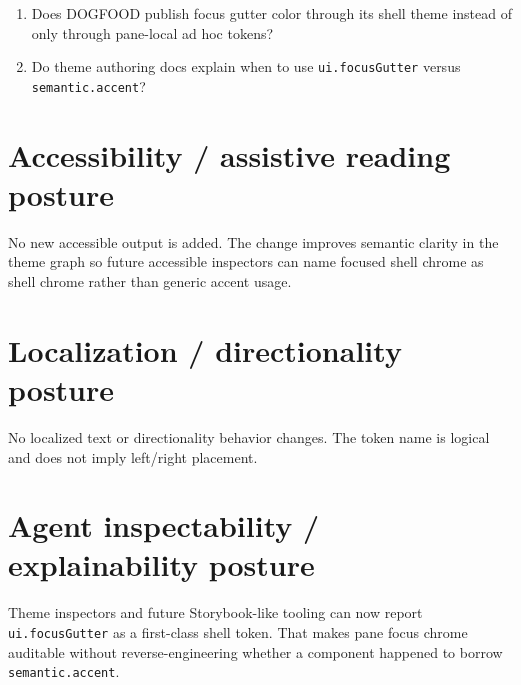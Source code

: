 \begin{enumerate}
\item
  Does DOGFOOD publish focus gutter color through its shell theme instead of only through pane-local ad hoc tokens?
\item
  Do theme authoring docs explain when to use \texttt{u\allowbreak{}i\allowbreak{}.\allowbreak{}f\allowbreak{}o\allowbreak{}c\allowbreak{}u\allowbreak{}s\allowbreak{}G\allowbreak{}u\allowbreak{}t\allowbreak{}t\allowbreak{}e\allowbreak{}r} versus \texttt{s\allowbreak{}e\allowbreak{}m\allowbreak{}a\allowbreak{}n\allowbreak{}t\allowbreak{}i\allowbreak{}c\allowbreak{}.\allowbreak{}a\allowbreak{}c\allowbreak{}c\allowbreak{}e\allowbreak{}n\allowbreak{}t}?
\end{enumerate}

\section{Accessibility / assistive reading posture}\label{record-177-accessibility-assistive-reading-posture}

No new accessible output is added. The change improves semantic clarity in the theme graph so future accessible inspectors can name focused shell chrome as shell chrome rather than generic accent usage.

\section{Localization / directionality posture}\label{record-177-localization-directionality-posture}

No localized text or directionality behavior changes. The token name is logical and does not imply left/right placement.

\section{Agent inspectability / explainability posture}\label{record-177-agent-inspectability-explainability-posture}

Theme inspectors and future Storybook-like tooling can now report \texttt{u\allowbreak{}i\allowbreak{}.\allowbreak{}f\allowbreak{}o\allowbreak{}c\allowbreak{}u\allowbreak{}s\allowbreak{}G\allowbreak{}u\allowbreak{}t\allowbreak{}t\allowbreak{}e\allowbreak{}r} as a first-class shell token. That makes pane focus chrome auditable without reverse-engineering whether a component happened to borrow \texttt{s\allowbreak{}e\allowbreak{}m\allowbreak{}a\allowbreak{}n\allowbreak{}t\allowbreak{}i\allowbreak{}c\allowbreak{}.\allowbreak{}a\allowbreak{}c\allowbreak{}c\allowbreak{}e\allowbreak{}n\allowbreak{}t}.

